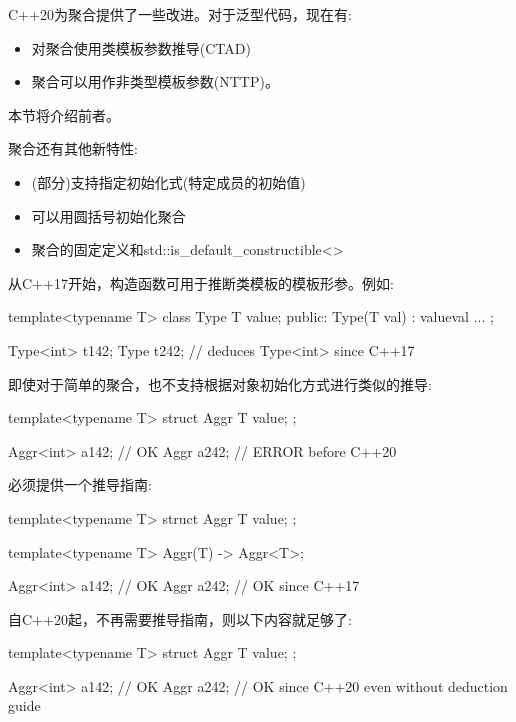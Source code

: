 
C++20为聚合提供了一些改进。对于泛型代码，现在有:

\begin{itemize}
\item
对聚合使用类模板参数推导(CTAD)

\item
聚合可以用作非类型模板参数(NTTP)。
\end{itemize}

本节将介绍前者。

聚合还有其他新特性:

\begin{itemize}
\item
(部分)支持指定初始化式(特定成员的初始值)

\item
可以用圆括号初始化聚合

\item
聚合的固定定义和std::is\_default\_constructible<>
\end{itemize}


从C++17开始，构造函数可用于推断类模板的模板形参。例如:

\begin{cpp}
template<typename T>
class Type {
	T value;
public:
	Type(T val)
	: value{val} {
	}
	...
};

Type<int> t1{42};
Type t2{42}; // deduces Type<int> since C++17
\end{cpp}

即使对于简单的聚合，也不支持根据对象初始化方式进行类似的推导:

\begin{cpp}
template<typename T>
struct Aggr {
	T value;
};

Aggr<int> a1{42}; // OK
Aggr a2{42}; // ERROR before C++20
\end{cpp}

必须提供一个推导指南:

\begin{cpp}
template<typename T>
struct Aggr {
	T value;
};

template<typename T>
Aggr(T) -> Aggr<T>;

Aggr<int> a1{42}; // OK
Aggr a2{42}; // OK since C++17
\end{cpp}

自C++20起，不再需要推导指南，则以下内容就足够了:

\begin{cpp}
template<typename T>
struct Aggr {
	T value;
};

Aggr<int> a1{42}; // OK
Aggr a2{42}; // OK since C++20 even without deduction guide
\end{cpp}

